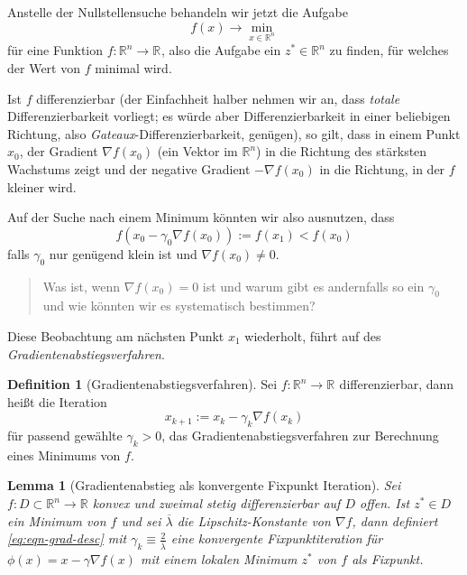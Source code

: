 \documentclass[
]{book}
\newenvironment {JHSAYS} [0] {\begin{quote}\color{jhsc}} {\end{quote}}
\newtheorem{lemma}{Lemma}[chapter]
\theoremstyle{definition}
\newtheorem{definition}{Definition}[chapter]
\theoremstyle{definition}
\theoremstyle{definition}
\theoremstyle{definition}
\theoremstyle{remark}
\begin{document}
Anstelle der Nullstellensuche behandeln wir jetzt die Aufgabe
\begin{equation*}
f(x) \to \min_{x\in \mathbb R^{n}}
\end{equation*}
für eine Funktion \(f \colon \mathbb R^{n} \to \mathbb R^{}\), also die Aufgabe ein \(z^*\in \mathbb R^{n}\) zu finden, für welches der Wert von \(f\) minimal wird.

Ist \(f\) differenzierbar (der Einfachheit halber nehmen wir an, dass \emph{totale} Differenzierbarkeit vorliegt; es würde aber Differenzierbarkeit in einer beliebigen Richtung, also \emph{Gateaux}-Differenzierbarkeit, genügen), so gilt, dass in einem Punkt \(x_0\), der Gradient \(\nabla f(x_0)\) (ein Vektor im \(\mathbb R^{n}\)) in die Richtung des stärksten Wachstums zeigt und der negative Gradient \(-\nabla f(x_0)\) in die Richtung, in der \(f\) kleiner wird.

Auf der Suche nach einem Minimum könnten wir also ausnutzen, dass
\begin{equation*}
f(x_0 - \gamma_0 \nabla f(x_0)):=f(x_1)   < f(x_0)
\end{equation*}
falls \(\gamma_0\) nur genügend klein ist und \(\nabla f(x_0) \neq 0\).

\leavevmode{}%
\begin{JHSAYS}
Was ist, wenn \(\nabla f(x_0) = 0\) ist und warum gibt es andernfalls so ein \(\gamma_0\) und wie könnten wir es systematisch bestimmen?

\end{JHSAYS}

Diese Beobachtung am nächsten Punkt \(x_1\) wiederholt, führt auf des \emph{Gradientenabstiegsverfahren}.

\begin{definition}[Gradientenabstiegsverfahren]
\protect\hypertarget{def:def-grad-descent}{}\label{def:def-grad-descent}Sei \(f\colon \mathbb R^{n} \to \mathbb R^{}\) differenzierbar, dann heißt die Iteration
\begin{equation}
x_{k+1} := x_k - \gamma_k\nabla f(x_k)
\label{eq:eqn-grad-desc}
\end{equation}
für passend gewählte \(\gamma_k>0\), das
Gradientenabstiegsverfahren zur Berechnung eines Minimums von \(f\).
\end{definition}

\begin{lemma}[Gradientenabstieg als konvergente Fixpunkt Iteration]
\protect\hypertarget{lem:lem-graddesc-as-fp}{}\label{lem:lem-graddesc-as-fp}Sei \(f\colon D\subset \mathbb R^{n}\to \mathbb R\) konvex und zweimal stetig differenzierbar auf \(D\) offen. Ist \(z^*\in D\) ein Minimum von \(f\) und sei \(\overline \lambda\) die \emph{Lipschitz-Konstante} von \(\nabla f\), dann definiert \eqref{eq:eqn-grad-desc} mit \(\gamma_k \equiv \frac 2{\overline \lambda}\) eine konvergente Fixpunktiteration für \(\phi(x) = x-\gamma \nabla f(x)\) mit einem lokalen Minimum \(z^*\) von \(f\) als Fixpunkt.
\end{lemma}
\end{document}

